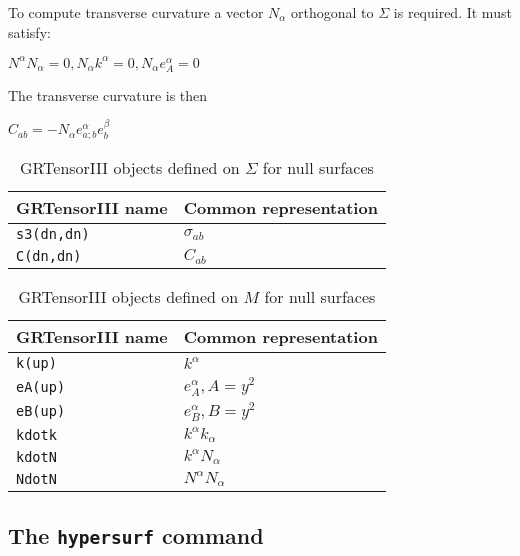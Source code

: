 \documentclass{article}
\begin{document}
To compute transverse curvature a vector $N_\alpha$ orthogonal to $\Sigma$ is required. It must satisfy:
\begin{center}
$N^\alpha N_\alpha = 0, N_\alpha k^\alpha = 0, N_\alpha e^\alpha_A = 0$
\end{center}
The transverse curvature is then 
\begin{center}
$C_{ab} = - N_\alpha e^\alpha_{a;b} e^\beta_b$
\end{center}

\renewcommand{\arraystretch}{1.5}
\begin{table}[h]
  \begin{center}
    \begin{tabular}{ll}\hline\hline
      \textbf{GRTensorIII name} & \textbf{Common representation}\\ \hline
      \texttt{s3(dn,dn)}        & $\sigma_{ab} $  \\
      \texttt{C(dn,dn)}        & $C_{ab} $  \\
    \end{tabular}
    \caption{GRTensorIII objects defined on $\Sigma$ for null surfaces}
    \label{tab:null1}
  \end{center}
\end{table}

\begin{table}[ht]
  \begin{center}
    \begin{tabular}{ll}\hline\hline
      \textbf{GRTensorIII name} & \textbf{Common representation}\\ \hline
      \texttt{k(up)}        & $k^\alpha$  \\
      \texttt{eA(up)}        & $e^\alpha_{A}, A=y^2 $  \\
      \texttt{eB(up)}        & $e^\alpha_{B}, B=y^2 $  \\
      \texttt{kdotk}        & $k^\alpha k_\alpha$  \\
      \texttt{kdotN}        & $k^\alpha N_\alpha$  \\
      \texttt{NdotN}        & $N^\alpha N_\alpha$  \\
    \end{tabular}
    \caption{GRTensorIII objects defined on $M$ for null surfaces}
    \label{tab:null1}
  \end{center}
\end{table}


\subsection{The \texttt{hypersurf} command}
\end{document}

